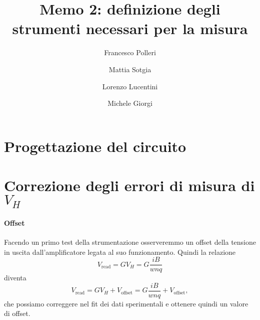 \documentclass[fleqn,varvw,11pt,tightenlines]{memo}
\begin{document}
\title{Memo 2: definizione degli strumenti necessari per la misura}

\author{Francesco Polleri}
\author{Mattia Sotgia}


\author{Lorenzo Lucentini}
\author{Michele Giorgi}

\revised{\today}

\begin{abstract}

\end{abstract}
\maketitle

\section{Progettazione del circuito}


\section{Correzione degli errori di misura di $V_H$}

\paragraph{Offset} Facendo un primo test della strumentazione osserveremmo un offset della tensione in uscita dall'amplificatore legata al suo funzionamento. Quindi la relazione \begin{equation}
    V_\text{read} = GV_H = G\frac{iB}{wnq}
\end{equation} diventa \begin{equation}
    V_\text{read} = GV_H + V_\text{offset} = G\frac{iB}{wnq} + V_\text{offset}\label{eq:offset},
\end{equation} che possiamo correggere nel fit dei dati sperimentali e ottenere quindi un valore di offset. 
\end{document}
